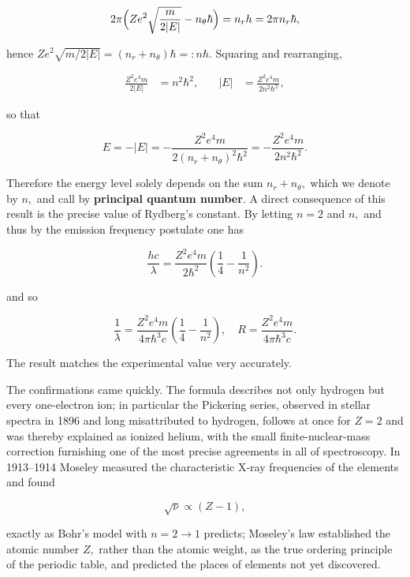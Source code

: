 \begin{linenomath}
    \begin{equation}
        2\pi\Bigl(Ze^2\sqrt{\frac{m}{2|E|}}-n_\theta\hbar\Bigr)=n_r h=2\pi n_r\hbar,
    \end{equation}
\end{linenomath}
hence $Ze^2\sqrt{m/2|E|}=(n_r+n_\theta)\hbar=:n\hbar.$ Squaring and rearranging,
\begin{linenomath}
    \begin{align}
        \frac{Z^{2}e^{4}m}{2|E|}&=n^{2}\hbar^{2},
        &\quad|E|&=\frac{Z^{2}e^{4}m}{2n^{2}\hbar^{2}},
    \end{align}
\end{linenomath}
so that
\begin{linenomath}
    \begin{equation}
        E = -|E| = -\frac{Z^2e^4m}{2(n_r+n_\theta)^2\hbar^2}
        = -\frac{Z^2e^4m}{2n^2\hbar^2}.
    \end{equation}
\end{linenomath}
Therefore the energy level solely depends on the sum $n_r+n_\theta,$ which we denote by $n,$ and call by \textbf{principal quantum number}. A direct consequence of this result is the precise value of Rydberg's constant. By letting $n=2$ and $n,$ and thus by the emission frequency postulate one has
\begin{linenomath}
    \begin{equation}
        \frac{hc}{\lambda} = \frac{Z^2e^4m}{2\hbar^2}\left( \frac14-\frac{1}{n^2} \right).
    \end{equation}
\end{linenomath}
and so
\begin{linenomath}
    \begin{equation}
        \frac{1}{\lambda} = \frac{Z^2e^4m}{4\pi\hbar^3c}\left( \frac14-\frac{1}{n^2} \right),\quad R=\frac{Z^2e^4m}{4\pi\hbar^3c}.
    \end{equation}
\end{linenomath}
The result matches the experimental value very accurately.

The confirmations came quickly. The formula describes not only hydrogen but every one-electron ion; in particular the Pickering series, observed in stellar spectra in 1896 and long misattributed to hydrogen, follows at once for $Z=2$ and was thereby explained as ionized helium, with the small finite-nuclear-mass correction furnishing one of the most precise agreements in all of spectroscopy. In 1913--1914 Moseley measured the characteristic X-ray frequencies of the elements and found
\begin{linenomath}
    \begin{equation}
        \sqrt{\nu}\propto (Z-1),
    \end{equation}
\end{linenomath}
exactly as Bohr's model with $n=2\to1$ predicts; Moseley's law established the atomic number $Z,$ rather than the atomic weight, as the true ordering principle of the periodic table, and predicted the places of elements not yet discovered.


